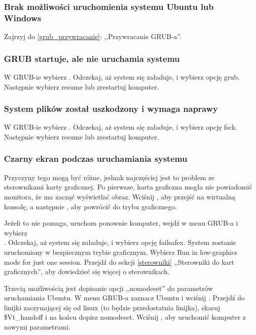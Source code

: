 \label{rozwiązywanie problemów}
\subsubsection{Brak możliwości uruchomienia systemu Ubuntu lub Windows}
Zajrzyj do \ref{grub_przywracanie}: ,,Przywracanie GRUB-a''.

\subsubsection{GRUB startuje, ale nie uruchamia systemu}
W GRUB-ie wybierz . Odczekaj, aż system się załaduje, i wybierz opcję \textcolor{ubuntu_orange}{grub}. Następnie wybierz \textcolor{ubuntu_orange}{resume} lub zrestartuj komputer.

\subsubsection{System plików został uszkodzony i wymaga naprawy}
W GRUB-ie wybierz . Odczekaj, aż system się załaduje, i wybierz opcję \textcolor{ubuntu_orange}{fsck}. Następnie wybierz \textcolor{ubuntu_orange}{resume} lub zrestartuj komputer.

\subsubsection{Czarny ekran podczas uruchamiania systemu}
Przyczyny tego mogą być różne, jednak najczęściej jest to problem ze sterownikami karty graficznej. Po pierwsze, karta graficzna mogła nie powiadomić monitora, że ma zacząć wyświetlać obraz. Wciśnij , aby przejść na wirtualną konsolę, a następnie , aby powrócić do trybu graficznego.

Jeżeli to nie pomaga, uruchom ponownie komputer, wejdź w menu GRUB-a i wybierz\\
. Odczekaj, aż system się załaduje, i wybierz opcję \textcolor{ubuntu_orange}{failsafex}. System zostanie uruchomiony w bezpiecznym trybie graficznym. Wybierz \textcolor{ubuntu_orange}{Run in low-graphics mode for just one session}. Przejdź do sekcji \ref{sterowniki} ,,Sterowniki do kart graficznych'', aby dowiedzieć się więcej o sterownikach.

Trzecią możliwością jest dopisanie opcji ,,nomodeset'' do parametrów uruchamiania Ubuntu. \linebreak W menu GRUB-a zaznacz Ubuntu i wciśnij . Przejdź do linijki zaczynającej się od \textcolor{ubuntu_orange}{linux}	(to będzie przedostatnia linijka), skasuj \$Vt\_handoff i na końcu dopisz \textcolor{ubuntu_orange}{nomodeset}. Wciśnij , aby uruchomić komputer z nowymi parametrami.

